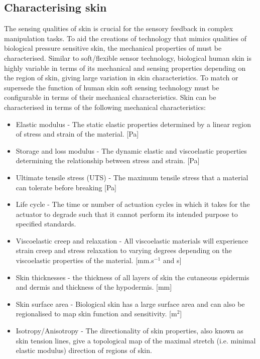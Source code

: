 \subsection{Characterising skin}
\label{subsec:Characterising skin}
The sensing qualities of skin is crucial for the sensory feedback in complex manipulation tasks. To aid the creations of technology that mimics qualities of biological pressure sensitive skin, the mechanical properties of must be characterised. Similar to soft/flexible sensor technology, biological human skin is highly variable in terms of its mechanical and sensing properties depending on the region of skin, giving large variation in skin characteristics. To match or supersede the function of human skin soft sensing technology must be configurable in terms of their mechanical characteristics. Skin can be characterised in terms of the following mechanical characteristics:
\begin{itemize}
    \item Elastic modulus -  The static elastic properties determined by a linear region of stress and strain of the material. [Pa]
    \item Storage and loss modulus - The dynamic elastic and viscoelastic properties determining the relationship between stress and strain. [Pa]
    \item Ultimate tensile stress (UTS) - The maximum tensile stress that a material can tolerate before breaking [Pa]
    \item Life cycle - The time or number of actuation cycles in which it takes for the actuator to degrade such that it cannot perform its intended purpose to specified standards.
    \item Viscoelastic creep and relaxation - All viscoelastic materials will experience strain creep and stress relaxation to varying degrees depending on the viscoelastic properties of the material. [mm.s$^{-1}$ and s]
    \item Skin thicknesses - the thickness of all layers of skin the cutaneous epidermis and dermis and thickness of the hypodermis. [mm]
    \item Skin surface area - Biological skin has a large surface area and can also be regionalised to map skin function and sensitivity. [m$^2$]
    \item Isotropy/Anisotropy - The directionality of skin properties, also known as skin tension lines, give a topological map of the maximal stretch (i.e. minimal elastic modulus) direction of regions of skin.
\end{itemize}
